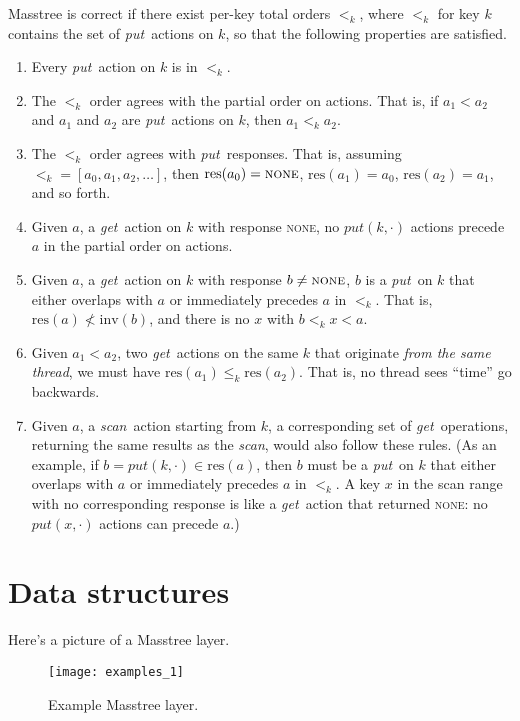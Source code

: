\documentclass[11pt]{article}
\newcommand{\NONE}{\textsc{none}}
\newcommand{\sysget}{\textit{get}}
\newcommand{\sysput}{\textit{put}}
\newcommand{\sysscan}{\textit{scan}}
\newcommand{\Inv}[1]{\ensuremath{\textrm{inv}(#1)}}
\newcommand{\Res}[1]{\ensuremath{\textrm{res}(#1)}}
\newcommand{\Precedes}{<}
\newcommand{\NotPrecedes}{\not <}
\newcommand{\PrecedesK}[1]{\ensuremath{\mathrel{<_{#1}}}}
\newcommand{\PrecedesEqK}[1]{\ensuremath{\mathrel{\leq_{#1}}}}
\begin{document}
Masstree is correct if there exist per-key total orders
\(\PrecedesK{k}\), where \(\PrecedesK{k}\) for key $k$ contains the set
of \sysput\ actions on $k$, so that the following properties are
satisfied.

\begin{enumerate}
\item Every \sysput\ action on $k$ is in \(\PrecedesK{k}\).
\item The \(\PrecedesK{k}\) order agrees with the partial order on actions. That is, if $a_1 \Precedes a_2$ and $a_1$ and $a_2$ are \sysput\ actions on $k$, then $a_1 \PrecedesK{k} a_2$.
\item The \(\PrecedesK{k}\) order agrees with \sysput\ responses. That is, assuming $\mathord{\PrecedesK{k}} = [a_0, a_1, a_2, \dots]$, then $\Res{a_0} = \NONE$, $\Res{a_1} = a_0$, $\Res{a_2} = a_1$, and so forth.
\item Given \(a\), a \sysget\ action on $k$ with response \NONE, no
  \(\sysput(k, \cdot)\) actions precede \(a\) in the partial order on actions.
\item Given \(a\), a \sysget\ action on $k$ with response $b \neq \NONE$, $b$ is a \sysput\ on $k$ that either overlaps with $a$ or immediately precedes $a$ in $\PrecedesK{k}$. That is, $\Res{a} \NotPrecedes \Inv{b}$, and there is no $x$ with $b \PrecedesK{k} x \Precedes a$.
\item Given \(a_1 \Precedes a_2\), two \sysget\ actions on the same $k$ that originate \emph{from the same thread}, we must have \(\Res{a_1} \PrecedesEqK{k} \Res{a_2}\). That is, no thread sees ``time'' go backwards.
\item Given \(a\), a \sysscan\ action starting from $k$, a corresponding set of \sysget\ operations, returning the same results as the \sysscan, would also follow these rules. (As an example, if \(b = \sysput(k, \cdot) \in \Res{a}\), then $b$ must be a \sysput\ on $k$ that either overlaps with $a$ or immediately precedes $a$ in $\PrecedesK{k}$. A key $x$ in the scan range with no corresponding response is like a \sysget\ action that returned \NONE: no \(\sysput(x, \cdot)\) actions can precede \(a\).)
\end{enumerate}


\section{Data structures}

Here's a picture of a Masstree layer.

\begin{figure}[H]
\texttt{[image: examples\_1]}
\caption{Example Masstree layer.}
\end{figure}
\end{document}
